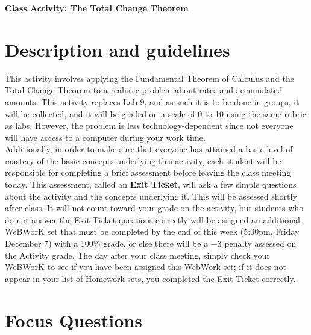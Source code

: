 \documentclass[11pt]{article}
\begin{document}
	
	\thispagestyle{empty}
	\renewcommand{\headrulewidth}{0.0pt}
	\thispagestyle{fancy}
	\lfoot{}
	\cfoot{}
	\rfoot{}	
	
	\vspace*{0in}

		\begin{center}
			\begin{large}
			\textbf{Class Activity: The Total Change Theorem} \\
			\end{large}
		\end{center}
	
\section{Description and guidelines} %
\label{sec:description_and_guidelines}

	
This activity involves applying the Fundamental Theorem of Calculus and the Total Change Theorem to a realistic problem about rates and accumulated amounts. This activity replaces Lab 9, and as such it is to be done in groups, it will be collected, and it will be graded on a scale of 0 to 10 using the same rubric as labs. However, the problem is less technology-dependent since not everyone will have access to a computer during your work time. \\

Additionally, in order to make sure that everyone has attained a basic level of mastery of the basic concepts underlying this activity, each student will be responsible for completing a brief assessment before leaving the class meeting today. This assessment, called an \textbf{Exit Ticket}, will ask a few simple questions about the activity and the concepts underlying it. This will be assessed shortly after class. It will not count toward your grade on the activity, but students who do not answer the Exit Ticket questions correctly will be assigned an additional WeBWorK set that must be completed by the end of this week (5:00pm, Friday December 7) with a 100\% grade, or else there will be a $-3$ penalty assessed on the Activity grade. The day after your class meeting, simply check your WeBWorK to see if you have been assigned this WebWork set; if it does not appear in your list of Homework sets, you completed the Exit Ticket correctly. 


\section{Focus Questions} %
\label{sec:focus_questions}
\end{document}
